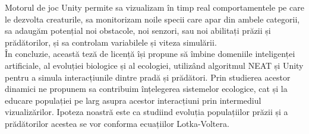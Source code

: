 Motorul de joc Unity permite sa vizualizam în timp real comportamentele pe care le dezvolta creaturile, sa monitorizam noile specii care apar din ambele categorii, sa adaugăm potențial noi obstacole, noi senzori, sau noi abilitați prăzii și prădătorilor, și sa controlam variabilele și viteza simulării.\\
În concluzie, această teză de licență își propune să îmbine domeniile inteligenței artificiale, al evoluției biologice și al ecologiei, utilizând algoritmul NEAT și Unity pentru a simula interacțiunile dintre pradă și prădători. Prin studierea acestor dinamici ne propunem sa contribuim înțelegerea sistemelor ecologice, cat și la educare populației pe larg asupra acestor interacțiuni prin intermediul vizualizărilor. Ipoteza noastră este ca studiind evoluția populațiilor prăzii și a prădătorilor acestea se vor conforma ecuațiilor Lotka-Voltera.